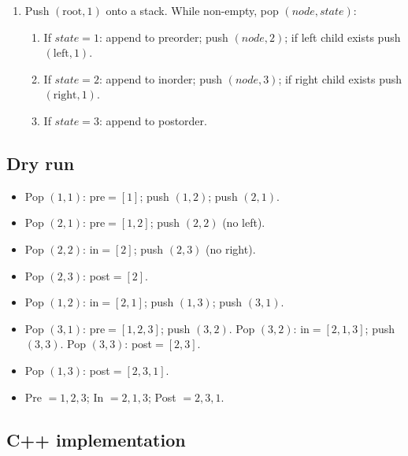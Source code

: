 \begin{enumerate}
  \item Push $(\text{root}, 1)$ onto a stack. While non-empty, pop
        $(node, state)$:
  \begin{enumerate}
    \item If $state=1$: append to preorder; push $(node,2)$; if left
          child exists push $(\text{left},1)$.
    \item If $state=2$: append to inorder; push $(node,3)$; if right
          child exists push $(\text{right},1)$.
    \item If $state=3$: append to postorder.
  \end{enumerate}
\end{enumerate}

\subsection*{Dry run}


\begin{itemize}
  \item Pop $(1,1)$: pre$=[1]$; push $(1,2)$; push $(2,1)$.
  \item Pop $(2,1)$: pre$=[1,2]$; push $(2,2)$ (no left).
  \item Pop $(2,2)$: in$=[2]$; push $(2,3)$ (no right).
  \item Pop $(2,3)$: post$=[2]$.
  \item Pop $(1,2)$: in$=[2,1]$; push $(1,3)$; push $(3,1)$.
  \item Pop $(3,1)$: pre$=[1,2,3]$; push $(3,2)$. Pop $(3,2)$:
        in$=[2,1,3]$; push $(3,3)$. Pop $(3,3)$: post$=[2,3]$.
  \item Pop $(1,3)$: post$=[2,3,1]$.
  \item Pre $=1,2,3$; \; In $=2,1,3$; \; Post $=2,3,1$.
\end{itemize}

\subsection*{C++ implementation}

